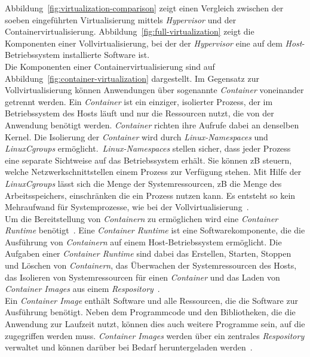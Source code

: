 Abbildung~\ref{fig:virtualization-comparison} zeigt einen Vergleich zwischen der soeben eingeführten Virtualisierung mittels \textit{Hypervisor} und
der Containervirtualisierung.
Abbildung~\ref{fig:full-virtualization} zeigt die Komponenten einer Vollvirtualisierung, bei der der \textit{Hypervisor}
eine auf dem \textit{Host}-Betriebssystem installierte Software ist.
\\
Die Komponenten einer Containervirtualisierung sind auf Abbildung~\ref{fig:container-virtualization} dargestellt.
Im Gegensatz zur Vollvirtualisierung können Anwendungen über sogenannte \textit{Container} voneinander getrennt werden.
Ein \textit{Container} ist ein einziger, isolierter Prozess, der im Betriebssystem des Hosts läuft und nur die Ressourcen nutzt, die von der Anwendung benötigt werden.
\textit{Container} richten ihre Aufrufe dabei an denselben Kernel. Die Isolierung der \textit{Container} wird durch \textit{Linux-Namespaces} und
\textit{LinuxCgroups} ermöglicht.~\textit{Linux-Namespaces} stellen sicher, dass jeder Prozess eine separate Sichtweise auf das Betriebssystem erhält.
Sie können \ac{zB} steuern, welche Netzwerkschnittstellen einem Prozess zur Verfügung stehen. Mit Hilfe der \textit{LinuxCgroups} lässt sich die Menge
der Systemressourcen, \ac{zB} die Menge des Arbeitsspeichers, einschränken die ein Prozess nutzen kann.
Es entsteht so kein Mehraufwand für Systemprozesse, wie bei der Vollvirtualisierung~\cite{kubernetes-in-action-introduction}.
\\
Um die Bereitstellung von \textit{Containern} zu ermöglichen wird eine \textit{Container Runtime} benötigt~\cite{kubernetes-overview}.
Eine \textit{Container Runtime} ist eine Softwarekomponente, die die Ausführung von \textit{Containern} auf einem Host-Betriebssystem ermöglicht.
Die Aufgaben einer \textit{Container Runtime} sind dabei das Erstellen, Starten, Stoppen und Löschen von \textit{Containern},
das Überwachen der Systemressourcen des Hosts, das Isolieren von Systemressourcen für einen \textit{Container}
und das Laden von \textit{Container Images} aus einem \textit{Respository}~\cite{container-runtime-aquasec}.
\\
Ein \textit{Container Image} enthält Software und alle Ressourcen, die die Software zur Ausführung benötigt.
Neben dem Programmcode und den Bibliotheken, die die Anwendung zur Laufzeit nutzt, können dies auch weitere Programme sein, auf die zugegriffen werden muss.
\textit{Container Images} werden über ein zentrales \textit{Respository} verwaltet und können darüber bei Bedarf heruntergeladen werden~\cite{container-image-dev-insider}.

